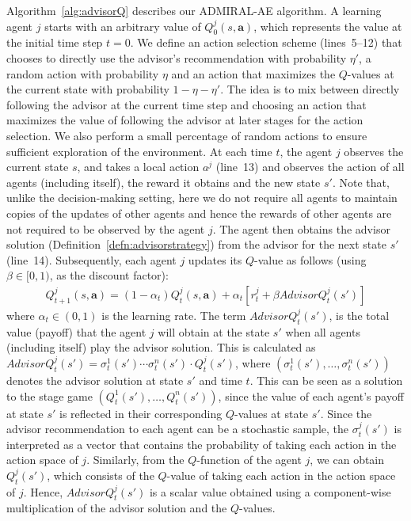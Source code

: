 \documentclass[jair, twoside,11pt,theapa]{article}
\begin{document}
Algorithm~\ref{alg:advisorQ} describes our ADMIRAL-AE algorithm. A  learning agent $j$ starts with an arbitrary value of $Q^j_0(s, \boldsymbol{a})$, which represents the value at the initial time step $t=0$. We define an action selection scheme (lines~5--12) that chooses to directly use the advisor's recommendation with probability $\eta'$, a random action with probability $\eta$ and an action that maximizes the $Q$-values at the current state with probability $1- \eta- \eta'$. The idea is to mix between directly following the advisor at the current time step and choosing an action that maximizes the value of following the advisor at later stages for the action selection. We also perform a small percentage of random actions to ensure sufficient exploration of the environment. At each time $t$, the agent $j$ observes the current state $s$, and takes a local action $a^j$ (line~13) and observes the action of all agents (including itself), the reward it obtains and the new state $s'$. Note that, unlike the decision-making setting, here we do not require all agents to maintain copies of the updates of other agents and hence the rewards of other agents are not required to be observed by the agent $j$. The agent then obtains the advisor solution (Definition~\ref{defn:advisorstrategy}) from the advisor for the next state $s'$ (line~14). Subsequently, each agent $j$ updates its $Q$-value as follows (using $\beta \in [0,1)$, 
 as the discount factor): 
\begin{equation}\label{eq:updateoffpolicyQ}
    \begin{array}{l}
         Q^j_{t+1}(s,\boldsymbol{a})  = (1-\alpha_t)Q_t^j(s,\boldsymbol{a}) +  
         \alpha_t[r_t^j + \beta AdvisorQ_t^j(s')]
    \end{array}
\end{equation}
where $\alpha_t \in (0,1)$ is the learning rate. The term 
$AdvisorQ_t^j(s')$, is the total value (payoff) that the agent $j$ will obtain at the state $s'$ when all agents (including itself) play the advisor solution. This is calculated as $AdvisorQ_t^j(s') = \sigma^1_t(s') \cdots \sigma^n_t(s') \cdot Q^j_t(s')$, where $(\sigma^1_t(s'), \ldots, \sigma^n_t(s'))$ denotes the advisor solution at state $s'$ and time $t$. This can be seen as a solution to the stage game $(Q^1_t(s'), \ldots, Q^n_t(s'))$, since the value of each agent's payoff at state $s'$ is reflected in their corresponding $Q$-values at state $s'$. Since the advisor recommendation to each agent can be a stochastic sample, the $\sigma^j_t(s')$ is interpreted as a vector that contains the probability of taking each action in the action space of $j$. Similarly, from the $Q$-function of the agent $j$, we can obtain $Q^j_t(s')$, which consists of the $Q$-value of taking each action in the action space of $j$. Hence, $AdvisorQ^j_t(s')$ is a scalar value obtained using a component-wise multiplication of the advisor solution and the $Q$-values. 
\end{document}
